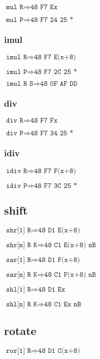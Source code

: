 \documentclass{article}
\begin{document}
$\texttt{mul R} \Rightarrow \texttt{48 F7 Ex}$

$\texttt{mul P} \Rightarrow \texttt{48 F7 24 25 *}$


\subsubsection*{imul}

$\texttt{imul R} \Rightarrow \texttt{48 F7 E(x+8)}$

$\texttt{imul P} \Rightarrow \texttt{48 F7 2C 25 *}$

$\texttt{imul R S} \Rightarrow \texttt{48 0F AF DD}$


\subsubsection*{div}

$\texttt{div R} \Rightarrow \texttt{48 F7 Fx}$

$\texttt{div P} \Rightarrow \texttt{48 F7 34 25 *}$


\subsubsection*{idiv}

$\texttt{idiv R} \Rightarrow \texttt{48 F7 F(x+8)}$

$\texttt{idiv P} \Rightarrow \texttt{48 F7 3C 25 *}$


\subsection*{shift}

$\texttt{shr[1] R} \Rightarrow \texttt{48 D1 E(x+8)}$

$\texttt{shr[n] R K} \Rightarrow \texttt{48 C1 E(x+8) nB}$

$\texttt{sar[1] R} \Rightarrow \texttt{48 D1 F(x+8)}$

$\texttt{sar[n] R K} \Rightarrow \texttt{48 C1 F(x+8) nB}$

$\texttt{shl[1] R} \Rightarrow \texttt{48 D1 Ex}$

$\texttt{shl[n] R K} \Rightarrow \texttt{48 C1 Ex nB}$


\subsection*{rotate}

$\texttt{ror[1] R} \Rightarrow \texttt{48 D1 C(x+8)}$
\end{document}
